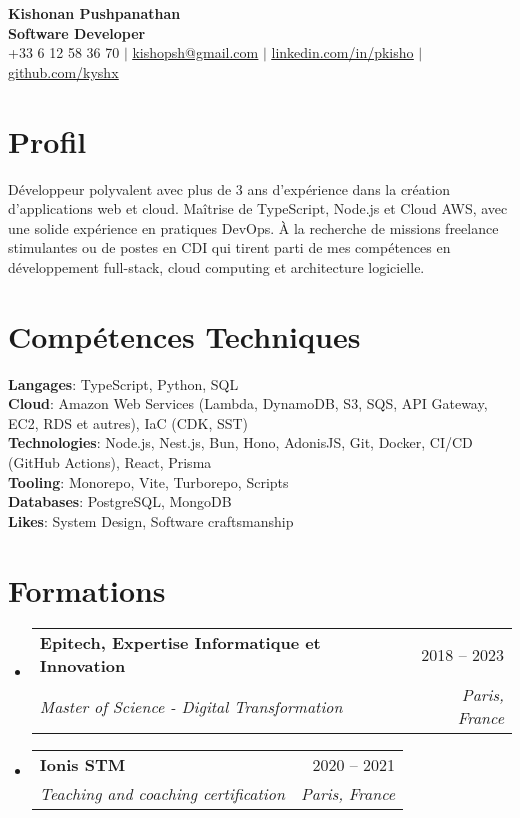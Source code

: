 \documentclass[letterpaper,11pt]{article}
\makeatletter
\newcommand{\resumeSubheading}[4]{
  \vspace{-2pt}\item
    \begin{tabular*}{0.97\textwidth}[t]{l@{\extracolsep{\fill}}r}
      \textbf{#1} & #2 \\
      \textit{\small#3} & \textit{\small #4} \\
    \end{tabular*}\vspace{-7pt}
}
\newcommand{\resumeSubHeadingListStart}{\begin{itemize}[leftmargin=0.15in, label={}]}
\newcommand{\resumeSubHeadingListEnd}{\end{itemize}}
\makeatother
\begin{document}
\begin{center}
    \textbf{\LARGE Kishonan Pushpanathan} \\ \vspace{3pt}
    \textbf{\large Software Developer} \\ \vspace{10pt}
    \small +33 6 12 58 36 70 $|$ \href{mailto:kishopsh@gmail.com}{\underline{kishopsh@gmail.com}} $|$
    \href{https://linkedin.com/in/pkisho}{\underline{linkedin.com/in/pkisho}} $|$
    \href{https://github.com/kyshx}{\underline{github.com/kyshx}} 
\end{center}

\section{Profil}
\small{
Développeur polyvalent avec plus de 3 ans d'expérience dans la création d'applications web et cloud. Maîtrise de TypeScript, Node.js et Cloud AWS, avec une solide expérience en pratiques DevOps. 
À la recherche de missions freelance stimulantes ou de postes en CDI qui tirent parti de mes compétences en développement full-stack, cloud computing et architecture logicielle.
}

\section{Compétences Techniques}
 \begin{itemize}[leftmargin=0.15in, label={}]
    \small{\item{
     \textbf{Langages}{: TypeScript, Python, SQL} \\
     \textbf{Cloud}{: Amazon Web Services (Lambda, DynamoDB, S3, SQS, API Gateway, EC2, RDS et autres), IaC (CDK, SST)} \\
     \textbf{Technologies}{: Node.js, Nest.js, Bun, Hono, AdonisJS, Git, Docker, CI/CD (GitHub Actions), React, Prisma} \\
     \textbf{Tooling}{: Monorepo, Vite, Turborepo, Scripts} \\
     \textbf{Databases}{: PostgreSQL, MongoDB} \\
     \textbf{Likes}{: System Design, Software craftsmanship} \\
     
    }}
 \end{itemize}

\section{Formations}
  \resumeSubHeadingListStart
    \resumeSubheading
      {Epitech, Expertise Informatique et Innovation}{2018 -- 2023}
      {Master of Science - Digital Transformation}{Paris, France}
    \resumeSubheading
      {Ionis STM}{2020 -- 2021}
      {Teaching and coaching certification}{Paris, France}
  \resumeSubHeadingListEnd
\end{document}
